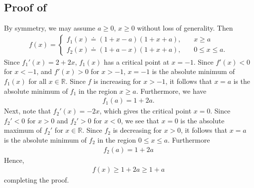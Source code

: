 \documentclass[12pt,reqno]{amsart}
\numberwithin{equation}{section}  %
\renewcommand{\cref}{\Cref}
\newcommand{\rr}{\mathbb{R}}
\begin{document}
\begin{appendices}
\subsection{Proof of \cref{lem:calc-lower-bound}}
\label{ssec:simp-est-proof}
By symmetry, we may assume $ a \ge 0$, $x \ge 0$ without loss of generality.
Then
%
%
\begin{equation*}
\begin{split}
f(x) = 
\begin{cases}
  f_{1}(x) \doteq (1 + x-a)(1 + x + a), \quad & x \ge a \\
  f_{2}(x) \doteq (1 + a -x)(1 + x + a), \quad & 0 \le x \le a.
\end{cases}
\end{split}
\end{equation*}
%
%
Since $f_{1}'(x) = 2 + 2x$, $f_{1}(x)$ has a critical point at $x=-1$. Since
$f'(x) < 0$ for $x <-1$, and $f'(x) > 0$ for $x > -1$, $x=-1$ is the absolute
minimum of $f_{1}(x)$ for all $x \in \rr$. Since $f$ is increasing for $x > -1$,
it follows that $x=a$ is the absolute minimum of $f_{1}$ in the region $x \ge
a$. Furthermore, we have
%
%
\begin{equation*}
\begin{split}
  f_{1}(a) = 1 + 2 a.
\end{split}
\end{equation*}
%
%
Next, note that $f_{2}'(x) = -2x$, which gives the critical point $x = 0$. Since
$f_{2}' < 0$ for $x>0$ and $f_{2}' > 0$ for $x < 0$, we see that $x=0$ is
the absolute maximum of $f_{2}'$ for  $x \in \rr$. Since $f_{2}$ is decreasing
for $x > 0$, it follows that $x = a$
is the absolute minimum of $f_{2}$ in the region $0 \le x \le a$. Furthermore
%
%
\begin{equation*}
\begin{split}
  f_{2}(a) = 1 + 2 a
\end{split}
\end{equation*}
%
%
Hence, 
%
%
\begin{equation*}
\begin{split}
f(x) \ge 1 + 2a \ge 1 + a
\end{split}
\end{equation*}
%
%
completing the proof. \qquad \qedsymbol
%

\end{appendices}
\end{document}
